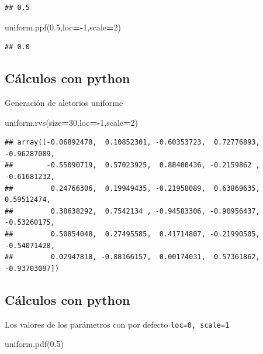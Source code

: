 \documentclass[]{book}
\newenvironment{Shaded}{\begin{snugshade}}{\end{snugshade}}
\newcommand{\DecValTok}[1]{\textcolor[rgb]{0.00,0.00,0.81}{#1}}
\newcommand{\FloatTok}[1]{\textcolor[rgb]{0.00,0.00,0.81}{#1}}
\newcommand{\NormalTok}[1]{#1}
\newcommand{\OperatorTok}[1]{\textcolor[rgb]{0.81,0.36,0.00}{\textbf{#1}}}
\begin{document}
\begin{verbatim}
## 0.5
\end{verbatim}

\begin{Shaded}
\begin{Highlighting}[]
\NormalTok{uniform.ppf(}\FloatTok{0.5}\NormalTok{,loc}\OperatorTok{=-}\DecValTok{1}\NormalTok{,scale}\OperatorTok{=}\DecValTok{2}\NormalTok{)}
\end{Highlighting}
\end{Shaded}

\begin{verbatim}
## 0.0
\end{verbatim}

\hypertarget{cuxe1lculos-con-python-15}{%
\subsection{Cálculos con python}\label{cuxe1lculos-con-python-15}}

Generación de aletorios uniforme

\begin{Shaded}
\begin{Highlighting}[]
\NormalTok{uniform.rvs(size}\OperatorTok{=}\DecValTok{30}\NormalTok{,loc}\OperatorTok{=-}\DecValTok{1}\NormalTok{,scale}\OperatorTok{=}\DecValTok{2}\NormalTok{)}
\end{Highlighting}
\end{Shaded}

\begin{verbatim}
## array([-0.06892478,  0.10852301, -0.60353723,  0.72776893, -0.96287089,
##        -0.55090719,  0.57023925,  0.88400436, -0.2159862 , -0.61681232,
##         0.24766306,  0.19949435, -0.21958089,  0.63869635,  0.59512474,
##         0.38638292,  0.7542134 , -0.94583306, -0.90956437, -0.53260175,
##         0.50854048,  0.27495585,  0.41714807, -0.21990505, -0.54071428,
##         0.02947818, -0.88166157,  0.00174031,  0.57361862, -0.93703097])
\end{verbatim}

\hypertarget{cuxe1lculos-con-python-16}{%
\subsection{Cálculos con python}\label{cuxe1lculos-con-python-16}}

Los valores de los parámetros con por defecto \texttt{loc=0,\ scale=1}

\begin{Shaded}
\begin{Highlighting}[]
\NormalTok{uniform.pdf(}\FloatTok{0.5}\NormalTok{)}
\end{Highlighting}
\end{Shaded}
\end{document}
